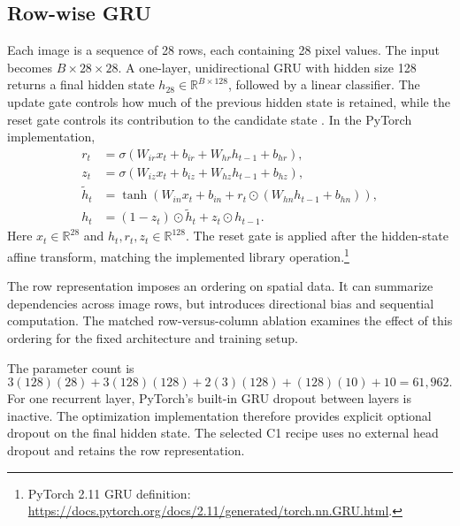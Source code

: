 \clearpage
\subsection{Row-wise GRU}
Each image is a sequence of 28 rows, each containing 28 pixel values. The input becomes $B\times28\times28$. A one-layer, unidirectional GRU with hidden size 128 returns a final hidden state $h_{28}\in\mathbb{R}^{B\times128}$, followed by a linear classifier. The update gate controls how much of the previous hidden state is retained, while the reset gate controls its contribution to the candidate state \cite{gru}. In the PyTorch implementation,
\[
\begin{aligned}
r_t&=\sigma(W_{ir}x_t+b_{ir}+W_{hr}h_{t-1}+b_{hr}),\\
z_t&=\sigma(W_{iz}x_t+b_{iz}+W_{hz}h_{t-1}+b_{hz}),\\
\widetilde h_t&=\tanh\!\left(W_{in}x_t+b_{in}+r_t\odot(W_{hn}h_{t-1}+b_{hn})\right),\\
h_t&=(1-z_t)\odot\widetilde h_t+z_t\odot h_{t-1}.
\end{aligned}
\]
Here $x_t\in\mathbb R^{28}$ and $h_t,r_t,z_t\in\mathbb R^{128}$. The reset gate is applied after the hidden-state affine transform, matching the implemented library operation.\footnote{PyTorch 2.11 GRU definition: \url{https://docs.pytorch.org/docs/2.11/generated/torch.nn.GRU.html}.}

The row representation imposes an ordering on spatial data. It can summarize dependencies across image rows, but introduces directional bias and sequential computation. The matched row-versus-column ablation examines the effect of this ordering for the fixed architecture and training setup.

The parameter count is
\[
3(128)(28)+3(128)(128)+2(3)(128)+(128)(10)+10=61,962.
\]
For one recurrent layer, PyTorch's built-in GRU dropout between layers is inactive. The optimization implementation therefore provides explicit optional dropout on the final hidden state. The selected C1 recipe uses no external head dropout and retains the row representation.

